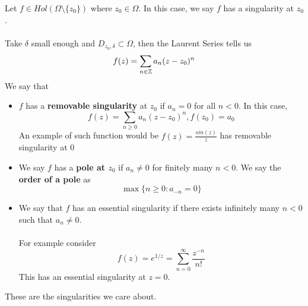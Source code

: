 \begin{definition}
    Let $f \in Hol(\Omega \setminus \{z_0\})$ where $z_0 \in \Omega$. In this case, we say $f$ has a singularity at $z_0$.\\\\
    Take $\delta$ small enough and $D_{z_0, \delta} \subset \Omega$, then the Laurent Series tells us
    \[f(z) = \sum_{n \in \mathbb{Z}} a_n (z - z_0)^n\]
    We say that
    \begin{itemize}
        \item $f$ has a \textbf{removable singularity} at $z_0$ if $a_n = 0$ for all $n < 0$. In this case,
        \[f(z) = \sum_{n \geq 0} a_n (z - z_0)^n, f(z_0) = a_0\]
        An example of such function would be $f(z) = \frac{sin(z)}{z}$ has removable singularity at $0$
        \item We say $f$ has a \textbf{pole at $z_0$} if $a_n \neq 0$ for finitely many $n < 0$. We say the \textbf{order of a pole} as
        \[\max \{n \geq 0: a_{-n} = 0\}\]
        \item We say that $f$ has an essential singularity if there exists infinitely many $n < 0$ such that $a_n \neq 0$.\\\\
        For example consider
        \[f(z) = e^{1/z} = \sum_{n = 0}^\infty \frac{z^{-n}}{n!}\]
        This has an essential singularity at $z = 0$.
    \end{itemize}
    These are the singularities we care about.
\end{definition}